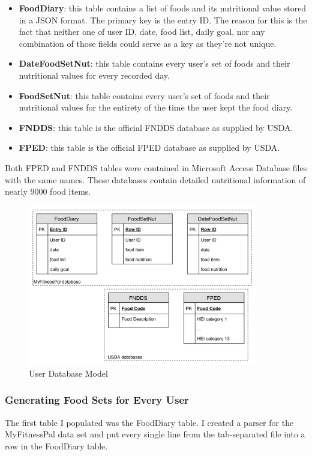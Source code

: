 \documentclass{article}
\begin{document}
\begin{itemize}
    \item \textbf{FoodDiary}: this table contains a list of foods and its nutritional value stored in a JSON format. The primary key is the entry ID. The reason for this is the fact that neither one of user ID, date, food list, daily goal, nor any combination of those fields could serve as a key as they're not unique.
    \item \textbf{DateFoodSetNut}: this table contains every user's set of foods and their nutritional values for every recorded day.
    \item \textbf{FoodSetNut}: this table contains every user's set of foods and their nutritional values for the entirety of the time the user kept the food diary. 
    \item \textbf{FNDDS}: this table is the official FNDDS database as supplied by USDA.
    \item \textbf{FPED}: this table is the official FPED database as supplied by USDA.
\end{itemize}

\noindent Both FPED and FNDDS tables were contained in Microsoft Access Database files with the same names. These databases contain detailed nutritional information of nearly 9000 food items.

\begin{figure}[h]
    \centering
    \includegraphics[width = 10cm]{user_database_model.png}
    \caption{User Database Model}
    \label{fig:user_database_model}
\end{figure}


\subsubsection{Generating Food Sets for Every User}
The first table I populated was the FoodDiary table. I created a parser for the MyFitnessPal data set \cite{diet_success_predictions} and put every single line from the tab-separated file into a row in the FoodDiary table. 
\end{document}
